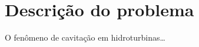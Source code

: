 \section{Descrição do problema}\label{sec:consideracoes}
O fenômeno de cavitação em hidroturbinas\ldots
